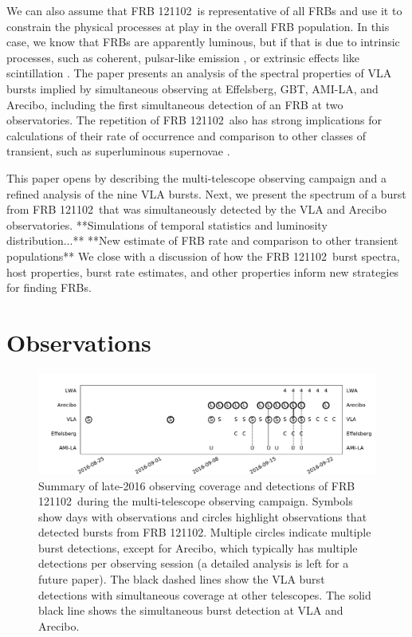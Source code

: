 \documentclass[twocolumn]{aastex61}
\newcommand{\frb}{FRB 121102}
\begin{document}
We can also assume that \frb\ is representative of all FRBs and use it to constrain the physical processes at play in the overall FRB population. In this case, we know that FRBs are apparently luminous, but if that is due to intrinsic processes, such as coherent, pulsar-like emission \citep{2014PhRvD..89j3009K, 2014ApJ...785L..26L, 2016MNRAS.457..232C}, or extrinsic effects like scintillation \citep{CORDES}. The paper presents an analysis of the spectral properties of VLA bursts implied by simultaneous observing at Effelsberg, GBT, AMI-LA, and Arecibo, including the first simultaneous detection of an FRB at two observatories. The repetition of \frb\ also has strong implications for calculations of their rate of occurrence \citep{2016MNRAS.458L..89C} and comparison to other classes of transient, such as superluminous supernovae \citep{OPT}.

This paper opens by describing the multi-telescope observing campaign and a refined analysis of the nine VLA bursts. Next, we present the spectrum of a burst from \frb\ that was simultaneously detected by the VLA and Arecibo observatories. **Simulations of temporal statistics and luminosity distribution...** **New estimate of FRB rate and comparison to other transient populations** We close with a discussion of how the \frb\ burst spectra, host properties, burst rate estimates, and other properties inform new strategies for finding FRBs.

\section{Observations}

\begin{figure}[t]
\begin{center}
\includegraphics[width=2\columnwidth]{timeline}
\caption{Summary of late-2016 observing coverage and detections of \frb\ during the multi-telescope observing campaign. Symbols show days with observations and circles highlight observations that detected bursts from \frb. Multiple circles indicate multiple burst detections, except for Arecibo, which typically has multiple detections per observing session (a detailed analysis is left for a future paper). The black dashed lines show the VLA burst detections with simultaneous coverage at other telescopes. The solid black line shows the simultaneous burst detection at VLA and Arecibo.
\label{fig:multi}}
\end{center}
\end{figure}
\end{document}
